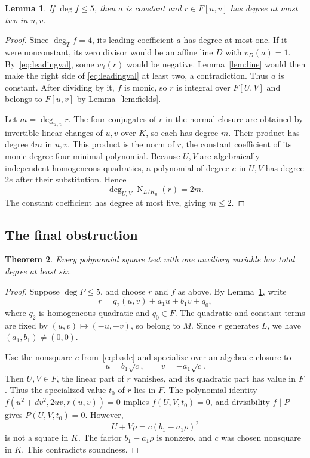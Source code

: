 \documentclass[11pt,a4paper]{article}
\newtheorem{theorem}{Theorem}[section]
\newtheorem{lemma}[theorem]{Lemma}
\DeclareMathOperator{\Norm}{N}
\begin{document}
\begin{lemma}\label{lem:polynomial-r}
If $\deg f\le5$, then $a$ is constant and $r\in F[u,v]$ has degree
at most two in $u,v$.
\end{lemma}
\begin{proof}
Since $\deg_Tf=4$, its leading coefficient $a$ has degree at most one.
If it were nonconstant, its zero divisor would be an affine line $D$
with $v_D(a)=1$. By~\eqref{eq:leadingval}, some $w_i(r)$ would be
negative. Lemma~\ref{lem:line} would then make the right side of
\eqref{eq:leadingval} at least two, a contradiction. Thus $a$ is
constant. After dividing by it, $f$ is monic, so $r$ is integral over
$F[U,V]$ and belongs to $F[u,v]$ by Lemma~\ref{lem:fields}.

Let $m=\deg_{u,v}r$. The four conjugates of $r$ in the normal
closure are obtained by invertible linear changes of $u,v$ over
$K$, so each has degree $m$. Their product has degree $4m$ in $u,v$.
This product is the norm of $r$, the constant coefficient of its monic
degree-four minimal polynomial. Because $U,V$ are algebraically
independent homogeneous quadratics, a polynomial of degree $e$ in
$U,V$ has degree $2e$ after their substitution. Hence
\[
                     \deg_{U,V}\Norm_{L/K_0}(r)=2m.
\]
The constant coefficient has degree at most five, giving $m\le2$.
\end{proof}

\subsection{The final obstruction}

\begin{theorem}\label{thm:lower}
Every polynomial square test with one auxiliary variable has total
degree at least six.
\end{theorem}
\begin{proof}
Suppose $\deg P\le5$, and choose $r$ and $f$ as above. By
Lemma~\ref{lem:polynomial-r}, write
\[
                  r=q_2(u,v)+a_1u+b_1v+q_0,
\]
where $q_2$ is homogeneous quadratic and $q_0\in F$.
The quadratic and constant terms are fixed by $(u,v)\mapsto(-u,-v)$,
so belong to $M$. Since $r$ generates $L$, we have
$(a_1,b_1)\ne(0,0)$.

Use the nonsquare $c$ from~\eqref{eq:badc} and specialize over an
algebraic closure to
\[
                       u=b_1\sqrt c,\qquad v=-a_1\sqrt c.
\]
Then $U,V\in F$, the linear part of $r$ vanishes, and its quadratic
part has value in $F$. Thus the specialized value $t_0$ of $r$ lies
in $F$. The polynomial identity $f(u^2+dv^2,2uv,r(u,v))=0$ implies
$f(U,V,t_0)=0$, and divisibility $f\mid P$ gives $P(U,V,t_0)=0$.
However,
\[
                   U+V\rho=c(b_1-a_1\rho)^2
\]
is not a square in $K$. The factor $b_1-a_1\rho$ is nonzero, and
$c$ was chosen nonsquare in $K$. This contradicts soundness.
\end{proof}
\end{document}
